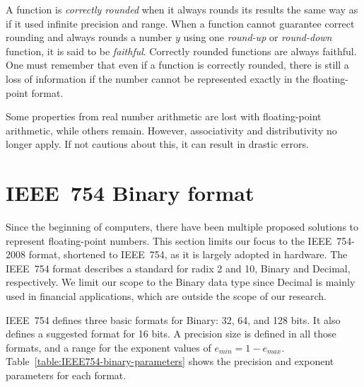 A function is \textit{correctly rounded} when it always rounds its results the 
same way as if it used infinite precision and range.
When a function cannot guarantee correct rounding and always rounds a number $y$
using one \textit{round-up} or \textit{round-down} function, it is said to be \textit{faithful}.
Correctly rounded functions are always faithful.
One must remember that even if a function is correctly rounded, there is
still a loss of information if the number cannot be represented exactly in the
floating-point format.

Some properties from real number arithmetic are lost with floating-point arithmetic, while others remain.
However, associativity and distributivity no longer apply.
If not cautious about this, it can result in drastic errors.
	
						
\section{IEEE~754 Binary format}
\label{sc:ieee754}
Since the beginning of computers, there have been multiple proposed solutions to represent floating-point numbers.
This section limits our focus to the IEEE~754-2008 format, shortened to IEEE~754, as it is largely adopted in hardware.
The IEEE~754 format describes a standard for radix 2 and 10, Binary and Decimal, respectively.
We limit our scope to the Binary data type since Decimal is mainly used in financial applications, which are outside the scope of our research.
						
IEEE~754 defines three basic formats for Binary: 32, 64, and 128 bits.
It also defines a suggested format for 16 bits.
A precision size is defined in all those formats, and a range for the exponent values of $e_{min} = 1 - e_{max}$.
Table~\ref{table:IEEE754-binary-parameters} shows the precision and exponent parameters for each format. 
						
